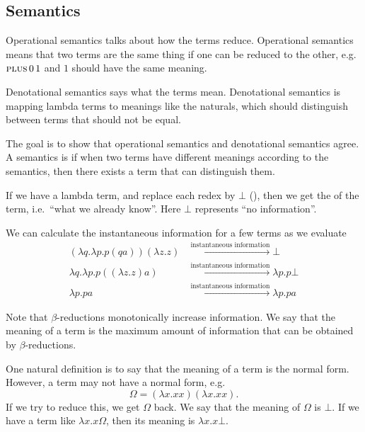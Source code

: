 \documentclass[class=scrartcl]{standalone}
\begin{document}
\subsection{Semantics}

Operational semantics talks about how the terms reduce.
Operational semantics means that two terms are the same thing if
one can be reduced to the other,
e.g.\ \(\textsc{plus} \, 0 \, 1\) and \(1\) should have the same meaning.

Denotational semantics says what the terms mean.
Denotational semantics is mapping lambda terms to meanings like the naturals,
which should distinguish between terms that should not be equal.

The goal is to show that operational semantics
and denotational semantics agree.
A semantics is  if
when two terms have different meanings according to the semantics,
then there exists a term that can distinguish them.

If we have a lambda term, and replace each redex by \(\bot\) (),
then we get the  of the term,
i.e.\ ``what we already know''. Here \(\bot\) represents ``no information''.

\begin{example}
  We can calculate the instantaneous information for a few terms as we evaluate
  \begin{align*}
    (\lambda q. \lambda p. p (q a)) (\lambda z. z)
      &\xrightarrow{\text{instantaneous information}} \bot \\
    \lambda q. \lambda p. p ((\lambda z. z) a)
      &\xrightarrow{\text{instantaneous information}} \lambda p. p \bot \\
    \lambda p. p a
      &\xrightarrow{\text{instantaneous information}} \lambda p. p a
  \end{align*}
\end{example}

Note that \(\beta\)-reductions monotonically increase information.
We say that the meaning of a term is the maximum amount of information
that can be obtained by \(\beta\)-reductions.

One natural definition is to say that the meaning of a term is the normal form.
However, a term may not have a normal form, e.g.\
\[
  \Omega = (\lambda x. x x)(\lambda x. x x).
\]
If we try to reduce this, we get \(\Omega\) back.
We say that the meaning of \(\Omega\) is \(\bot\).
If we have a term like \(\lambda x. x \Omega\),
then its meaning is \(\lambda x. x \bot\).
\end{document}
